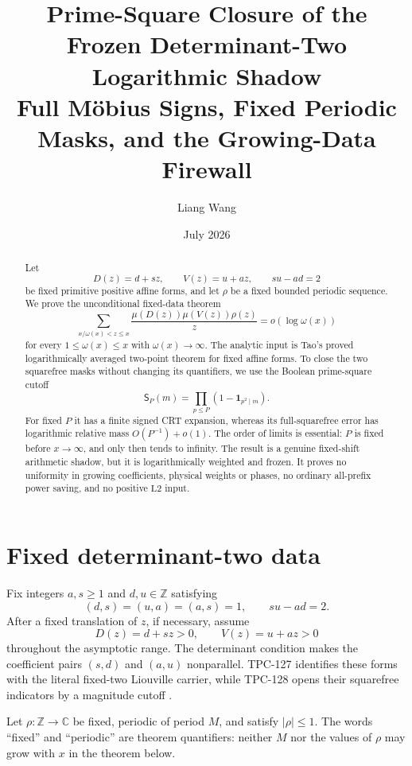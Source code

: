 \documentclass[11pt]{article}
\title{\textbf{Prime-Square Closure of the Frozen
Determinant-Two Logarithmic Shadow}\\
\large Full M\"obius Signs, Fixed Periodic Masks, and the
Growing-Data Firewall}
\author{Liang Wang}
\date{July 2026}
\theoremstyle{definition}
\theoremstyle{remark}
\newcommand{\one}{\mathbf 1}
\newcommand{\Ltwo}{\mathrm{L2}}
\begin{document}
\maketitle

\begin{abstract}
Let
\[
 D(z)=d+sz,\qquad V(z)=u+az,\qquad su-ad=2
\]
be fixed primitive positive affine forms, and let \(\rho\) be a
fixed bounded periodic sequence.  We prove the unconditional
fixed-data theorem
\[
 \sum_{x/\omega(x)<z\le x}
 \frac{\mu(D(z))\mu(V(z))\rho(z)}{z}
 =o(\log\omega(x))
\]
for every \(1\le\omega(x)\le x\) with \(\omega(x)\to\infty\).
The analytic input is Tao's proved logarithmically averaged
two-point theorem for fixed affine forms.  To close the two
squarefree masks without changing its quantifiers, we use the
Boolean prime-square cutoff
\[
 \mathsf S_P(m)=\prod_{p\le P}(1-\one_{p^2\mid m}).
\]
For fixed \(P\) it has a finite signed CRT expansion, whereas its
full-squarefree error has logarithmic relative mass
\(O(P^{-1})+o(1)\).  The order of limits is essential: \(P\) is
fixed before \(x\to\infty\), and only then tends to infinity.
The result is a genuine fixed-shift arithmetic shadow, but it is
logarithmically weighted and frozen.  It proves no uniformity in
growing coefficients, physical weights or phases, no ordinary
all-prefix power saving, and no positive \(\Ltwo\) input.
\end{abstract}

\section{Fixed determinant-two data}

Fix integers \(a,s\ge1\) and \(d,u\in\mathbb Z\) satisfying
\begin{equation}
 (d,s)=(u,a)=(a,s)=1,\qquad su-ad=2.
\label{eq:primitive}
\end{equation}
After a fixed translation of \(z\), if necessary, assume
\[
 D(z)=d+sz>0,\qquad V(z)=u+az>0
\]
throughout the asymptotic range.  The determinant condition makes
the coefficient pairs \((s,d)\) and \((a,u)\) nonparallel.
TPC-127 identifies these forms with the literal fixed-two
Liouville carrier, while TPC-128 opens their squarefree indicators
by a magnitude cutoff \citep{WangTPC127,WangTPC128}.

Let \(\rho:\mathbb Z\to\mathbb C\) be fixed, periodic of period
\(M\), and satisfy \(|\rho|\le1\).  The words ``fixed'' and
``periodic'' are theorem quantifiers: neither \(M\) nor the values
of \(\rho\) may grow with \(x\) in the theorem below.
\end{document}
